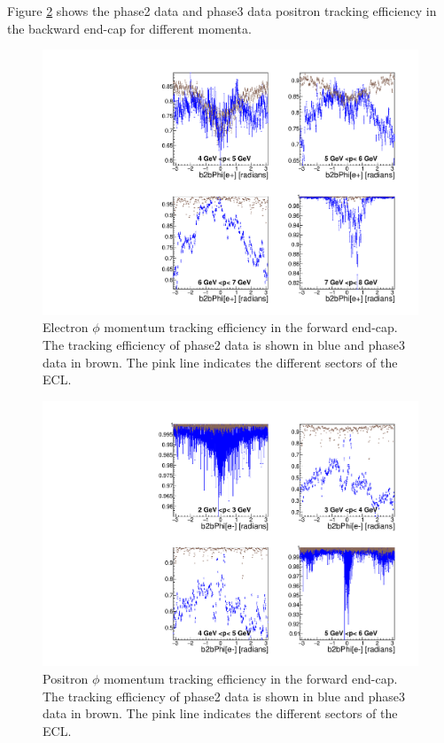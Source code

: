 \documentclass[a4paper,11pt,twosided,final,german,openbib,pdftex,listof=totoc,bibliography=totoc]{scrbook}
\begin{document}
Figure \ref{plt:compPhiemEC} shows the phase2 data and phase3 data positron tracking efficiency in the backward end-cap for different momenta.




\begin{figure}[!htbp]
	\centering
	\includegraphics[width=\textwidth]{Plots/comp/cMPhiemFC_Data.pdf}
	\caption[Momentum $\phi$ Electron Efficiency Forward End-Cap Phase2 And Phase3 Data]{Electron $\phi$ momentum tracking efficiency in the forward end-cap. The tracking efficiency of phase2 data is shown in blue and phase3 data in brown. The pink line indicates the different sectors of the ECL.}
	\label{plt:compPhiemFC}
\end{figure}


\begin{figure}[!htbp]
	\centering
	\includegraphics[width=\textwidth]{Plots/comp/cMPhiepEC_Data.pdf}
	\caption[Momentum $\phi$ Positron Efficiency Backward End-Cap Phase2 And Phase3 Data]{Positron $\phi$ momentum tracking efficiency in the forward end-cap. The tracking efficiency of phase2 data is shown in blue and phase3 data in brown. The pink line indicates the different sectors of the ECL.}
	\label{plt:compPhiemEC}
\end{figure}
\end{document}
